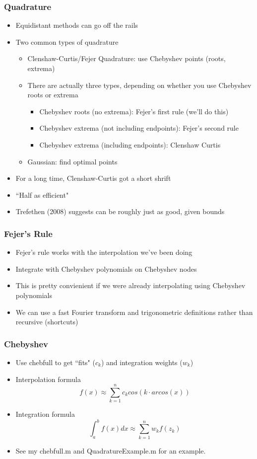 \documentclass{beamer}
\begin{document}
\begin{frame}
\frametitle[alignment=center]{Quadrature}
\begin{itemize}
\item Equidistant methods can go off the rails
\smallskip
\item Two common types of quadrature
\smallskip
\begin{itemize}
\item Clenshaw-Curtis/Fejer Quadrature: use Chebyshev points (roots, extrema)
\smallskip
\item There are actually three types, depending on whether you use Chebyshev roots or extrema
\begin{itemize}
\item Chebyshev roots (no extrema):  Fejer's first rule (we'll do this)
\item Chebyshev extrema (not including endpoints): Fejer's second rule
\item Chebyshev extrema (including endpoints): Clenshaw Curtis
\end{itemize}
\smallskip
\item Gaussian: find optimal points
\smallskip
\end{itemize}
\item For a long time, Clenshaw-Curtis got a short shrift
\smallskip
\item ``Half as efficient"
\smallskip
\item Trefethen (2008) suggests can be roughly just as good, given bounds
\end{itemize}
\end{frame}


\begin{frame}
\frametitle[alignment=center]{Fejer's Rule}
\begin{itemize}
\item Fejer's rule works with the interpolation we've been doing
\bigskip
\item Integrate with Chebyshev polynomials on Chebyshev nodes
\bigskip
\item This is pretty convienient if we were already interpolating using Chebyshev polynomials
\bigskip
\item We can use a fast Fourier transform and trigonometric definitions rather than recursive (shortcuts)
\end{itemize}
\end{frame}

\begin{frame}
\scriptsize
\frametitle[alignment=center]{Chebyshev}
\begin{itemize}
\item Use chebfull to get ``fits" ($c_k$) and integration weights ($w_k$)
\bigskip
\item Interpolation formula
$$f(x) \approx \sum_{k=1}^n c_k cos(k \cdot arcos(x)) $$
\item Integration formula
$$\int_a^bf(x)dx \approx \sum_{k=1}^n w_kf(z_k)$$
\item See my chebfull.m and QuadratureExample.m for an example.
\end{itemize}
\end{frame}
\end{document}
